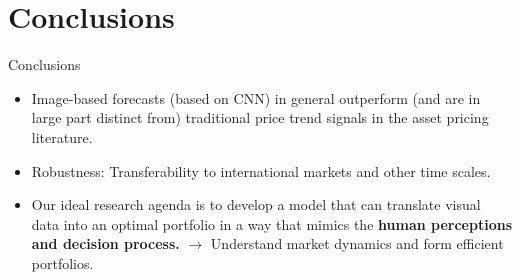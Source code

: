 \documentclass{beamer}
\begin{document}
\section{Conclusions}
\begin{frame}{Conclusions}
    \begin{itemize}
        \item Image-based forecasts (based on CNN) in general outperform (and are in large part distinct from) traditional price trend signals in the asset pricing literature.
        \item Robustness: Transferability to international markets and other time scales.
        \item Our ideal research agenda is to develop a model that can translate visual data into an optimal portfolio in a way that mimics the \textbf{human perceptions and decision process.} $\to$ Understand market dynamics and form efficient portfolios.
    \end{itemize}
\end{frame}
\end{document}
